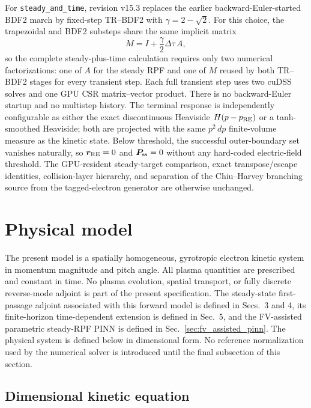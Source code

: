 \documentclass[11pt]{article}
\begin{document}
For \texttt{steady\_and\_time}, revision v15.3 replaces the earlier backward-Euler-started
BDF2 march by fixed-step TR--BDF2 with $\gamma=2-\sqrt{2}$.  For this choice, the trapezoidal
and BDF2 substeps share the same implicit matrix
\begin{equation*}
 M=I+\frac{\gamma}{2}\Delta\tau\,A,
\end{equation*}
so the complete steady-plus-time calculation requires only two numerical factorizations:
one of $A$ for the steady RPF and one of $M$ reused by both TR--BDF2 stages for every transient
step.  Each full transient step uses two cuDSS solves and one GPU CSR matrix--vector product.
There is no backward-Euler startup and no multistep history.  The terminal response is independently
configurable as either the exact discontinuous Heaviside $H(p-p_{\rm RE})$ or a tanh-smoothed
Heaviside; both are projected with the same $p^2\,dp$ finite-volume measure as the kinetic state.
Below threshold, the successful outer-boundary set vanishes naturally, so
$\bm r_{\rm RE}=0$ and $\bm P_{\rm ss}=0$ without any hard-coded electric-field threshold.
The GPU-resident steady-target comparison, exact transpose/escape identities, collision-layer
hierarchy, and separation of the Chiu--Harvey branching source from the tagged-electron generator
are otherwise unchanged.
\section{Physical model}

The present model is a spatially homogeneous, gyrotropic electron kinetic system in
momentum magnitude and pitch angle.  All plasma quantities are prescribed and constant
in time.  No plasma evolution, spatial transport, or fully discrete reverse-mode adjoint
is part of the present specification.  The steady-state first-passage adjoint associated
with this forward model is defined in Secs.~3 and 4, its finite-horizon time-dependent
extension is defined in Sec.~5, and the FV-assisted parametric steady-RPF PINN is defined
in Sec.~\ref{sec:fv_assisted_pinn}.  The physical system is defined below in dimensional
form.  No reference normalization used by the numerical solver is introduced until the
final subsection of this section.

\subsection{Dimensional kinetic equation}
\end{document}

